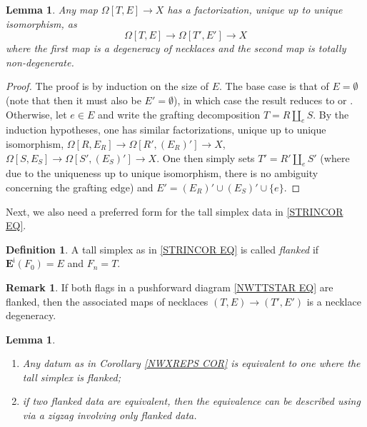 \documentclass[a4paper,10pt
,draft
]{article}%
\numberwithin{equation}{section}
\numberwithin{figure}{section}
\newtheorem{lemma}[equation]{Lemma}%
\theoremstyle{definition} %
\newtheorem{definition}[equation]{Definition}%
\newtheorem{remark}[equation]{Remark}%
\newcommand{\1}{\ensuremath{\mathbbm 1}}%
\begin{document}
\begin{lemma}\label{DEGNECK LEM}
	Any map 
	$\Omega[T,E] \to X$
	has a factorization, unique up to unique isomorphism, as
	\[
	\Omega[T,E] \to \Omega[T',E'] \to X
	\]
	where the first map is a degeneracy of necklaces
	and the second map is totally non-degenerate.
\end{lemma}


\begin{proof}
	The proof is by induction on the size of $E$.
	The base case is that of $E = \emptyset$
	(note that then it must also be $E'=\emptyset$),
	in which case the result reduces to 
	\cite[Prop. 6.9]{CM11} or
	\cite[Prop. 5.62]{Per18}.
	Otherwise, let $e \in E$
	and write the grafting decomposition
	$T = R \amalg_e S$.
	By the induction hypotheses, one has similar factorizations, unique up to unique isomorphism,
	$\Omega[R,E_R] \to \Omega[R',(E_R)'] \to X$,
	$\Omega[S,E_S] \to \Omega[S',(E_S)'] \to X$.
	One then simply sets 
	$T' = R' \amalg_e S'$
	(where due to the uniqueness up to unique isomorphism, there is no ambiguity concerning the grafting edge)
	and $E' = (E_R)' \cup (E_S)' \cup \{e\}$.
\end{proof}



Next, we also need a preferred form for the tall simplex data in \eqref{STRINCOR EQ}.



\begin{definition}
	A tall simplex as in 
	\eqref{STRINCOR EQ}
	is called \emph{flanked}
	if $\boldsymbol{E}^{\mathsf{i}}(F_0) = E$
	and $F_n = T$.
\end{definition}


\begin{remark}
	If both flags in a pushforward diagram
	\eqref{NWTTSTAR EQ}
	are flanked,
	then the associated maps of necklaces
	$(T,E) \to (T',E')$
	is a necklace degeneracy.
\end{remark}


\begin{lemma}\label{FLANKING LEM}
	\begin{enumerate}[label=(\roman*)]
		\item Any datum as in Corollary \ref{NWXREPS COR} is equivalent to one where the tall simplex is flanked;
		\item if two flanked data are equivalent, then the equivalence can be described using via a zigzag involving only flanked data.
	\end{enumerate}
\end{lemma}
\end{document}
